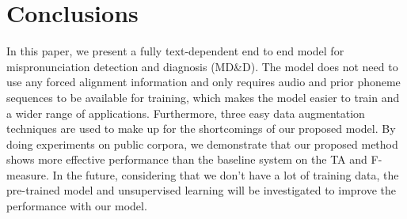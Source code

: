 \documentclass[a4paper]{article}
\begin{document}
\section{Conclusions}
In this paper, we present a fully text-dependent end to end model for mispronunciation detection and diagnosis (MD\&D). The model does not need to use any forced alignment information and only requires audio and prior phoneme sequences to be available for training, which makes the model easier to train and a wider range of applications. Furthermore, three easy data augmentation techniques are used to make up for the shortcomings of our proposed model. By doing experiments on public corpora, we demonstrate that our proposed method shows more effective performance than the baseline system on the TA and F-measure. 
In the future, considering that we don’t have a lot of training data, the pre-trained model and unsupervised learning will be investigated to improve the performance with our model.


\clearpage



\end{document}
